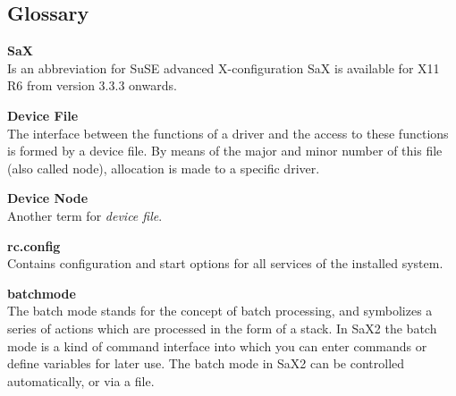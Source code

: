 \begin{twocolumn}
\setcounter{secnumdepth}{-1}
\chapter{Glossary}

\begin{description}

\begin{small}
\item {\textbf{SaX}\\} {
  Is an abbreviation for SuSE advanced X-configuration
  SaX is available for X11 R6 from version 3.3.3 onwards.
}

\item {\textbf{Device File}\\} {
  The interface between the functions of a driver and the access to these
  \linebreak functions is formed by a device file. By means of the major and
  minor number of this file (also called node), allocation is made to a
  specific driver.  
}

\item {\textbf{Device Node}\\} {
  Another term for \textit{device file}.
}

\item {\textbf{rc.config}\\} {
  Contains configuration and start options for all services of the installed
  system. 
}

\item {\textbf{batchmode}\\} {
  The batch mode stands for the concept of batch processing, and symbolizes a
  series of actions which are processed in the form of a stack. In SaX2 the 
  batch mode is a kind of command interface into which you can enter commands
  or define variables for later use. The batch mode in SaX2 can be controlled
  automatically, or via a file.  
}

\end{small}
\end{description}
\end{twocolumn}


\onecolumn


